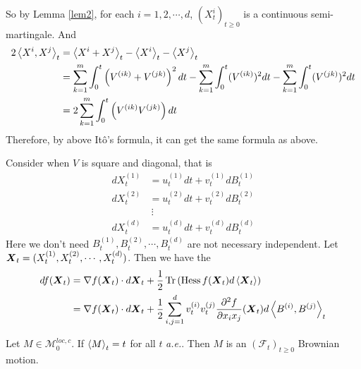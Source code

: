 \documentclass[a4paper,12pt]{article}
\begin{document}
\begin{itemize}
\begin{exam}
    \noindent So by Lemma \ref{lem2}, for each $i = 1,2,\cdots,d$, $(X_t^i)_{t \geqslant 0}$ is a continuous semi-martingale. And
    \begin{equation*}
      \begin{split}
        2\left\langle X^i,X^j \right\rangle_t & = \left\langle X^i + X^j \right\rangle_t - \left\langle X^i \right\rangle_t -\left\langle X^j \right\rangle_t \\
        &= \sum_{k=1}^m\int_0^t\left(V^{(ik)}+V^{(jk)}\right)^2dt - \sum_{k=1}^m \int_0^t (V^{(ik)})^2dt -\sum_{k=1}^m \int_0^t (V^{(jk)})^2dt \\
        &= 2\sum_{k=1}^m\int_0^t\left(V^{(ik)}V^{(jk)}\right)dt
      \end{split}
    \end{equation*}
    Therefore, by above It\^o's formula, it can get the same formula as above.
  \end{exam}
  \begin{exam}
    Consider when $V$ is square and diagonal, that is
    \begin{equation*}
      \begin{aligned}
        dX_t^{(1)} &= u_t^{(1)}dt + v_t^{(1)}dB_t^{(1)} \\
        dX_t^{(2)} &= u_t^{(2)}dt + v_t^{(2)}dB_t^{(2)} \\
        &~\vdots \\
        dX_t^{(d)} &= u_t^{(d)}dt + v_t^{(d)}dB_t^{(d)}
      \end{aligned}
    \end{equation*}
    Here we don't need $B_t^{(1)},B_t^{(2)},\cdots,B_t^{(d)}$ are not necessary independent. Let $\boldsymbol{X}_t = (X_t^{(1)},X_t^{(2)},\cdots,X_t^{(d)})$. Then we have the
    \begin{equation*}
      \begin{aligned}
        df(\boldsymbol{X}_t) &= \nabla f(\boldsymbol{X}_t) \cdot d\boldsymbol{X}_t + \frac{1}{2}\operatorname{Tr}\left(\operatorname{Hess}f(\boldsymbol{X}_t)d\left\langle \boldsymbol{X}_t \right\rangle\right) \\
        &= \nabla f(\boldsymbol{X}_t) \cdot d\boldsymbol{X}_t + \frac{1}{2} \sum_{i,j=1}^d v_t^{(i)}v_t^{(j)}\frac{\partial^2 f}{\partial x_ix_j}(\boldsymbol{X}_t)d\left\langle B^{(i)},B^{(j)} \right\rangle_t
      \end{aligned}
    \end{equation*}

  \end{exam}

  \begin{thm}
    Let $M \in \mathcal{M}_0^{loc,c}$. If $\left\langle M \right\rangle_t = t$ for all $t$ \emph{a.e.}. Then $M$ is an $(\mathcal{F}_t)_{t\geqslant 0}$ Brownian motion.
  \end{thm}


\end{itemize}
\end{document}
